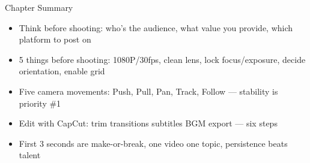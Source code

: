 \begin{tcbsummary}{Chapter Summary}
\begin{itemize}
  \item Think before shooting: who's the audience, what value you provide, which platform to post on
  \item 5 things before shooting: 1080P/30fps, clean lens, lock focus/exposure, decide orientation, enable grid
  \item Five camera movements: Push, Pull, Pan, Track, Follow — stability is priority \#1
  \item Edit with CapCut: trim transitions subtitles BGM export — six steps
  \item First 3 seconds are make-or-break, one video one topic, persistence beats talent
\end{itemize}

\end{tcbsummary}
